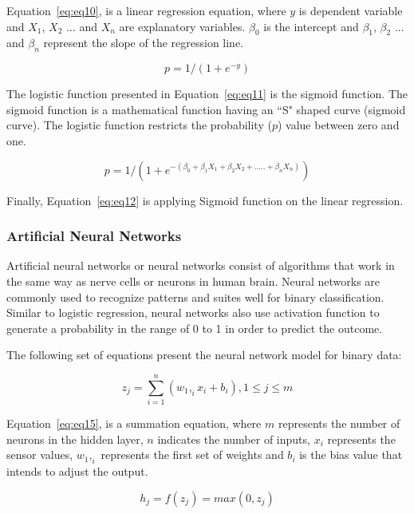 \documentclass[runningheads]{llncs}
\begin{document}
Equation~\ref{eq:eq10}, is a linear regression equation, where $y$ is dependent variable and $X_1$, $X_2$ $...$ and $X_n$ are explanatory variables. $\beta_0$ is the intercept and  $\beta_1$, $\beta_2$  ... and  $\beta_n$ represent the slope of the regression line.

\begin{equation}
\label{eq:eq11}
p = 1/(1 + e^{-y})
\end{equation}

The logistic function presented in Equation~\ref{eq:eq11} is the sigmoid function. The sigmoid function is a mathematical function having an ``S" shaped curve (sigmoid curve). The logistic function restricts the probability ($p$) value between zero and one.

\begin{equation}
\label{eq:eq12}
p = 1/(1 + e^{-(\beta_0 + \beta_1 X_1 + \beta_2 X_2 + ..... + \beta_n X_n)})
\end{equation}

Finally, Equation~\ref{eq:eq12} is applying Sigmoid function on the linear regression.

\subsubsection {Artificial Neural Networks}
\label{sec:NW}
Artificial neural networks or neural networks consist of algorithms that work in the same way as nerve cells or neurons in human brain. Neural networks are commonly used to recognize patterns and suites well for binary classification. Similar to logistic regression, neural networks also use activation function to generate a probability in the range of 0 to 1 in order to predict the outcome. 

The following set of equations present the neural network model for binary data:

\begin{equation}
\label{eq:eq15}
z_j = \sum_{i=1}^{n} (w_1,_ix_i + b_i),  1 \leq j \leq m
\end{equation}

Equation~\ref{eq:eq15}, is a summation equation, where $m$ represents the number of neurons in the hidden layer, $n$ indicates the number of inputs, $x_i$ represents the sensor values, $w_1,_i$ represents the first set of weights and $b_i$ is the bias value that intends to adjust the output.

\begin{equation}
\label{eq:eq13}
h_j = f(z_j) = max(0, z_j)
\end{equation}
\end{document}
